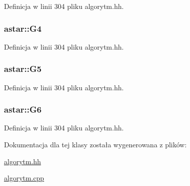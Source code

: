 Definicja w linii 304 pliku algorytm.\-hh.

\hypertarget{classastar_a347408992c953b3208642c68c106b9ac}{
\subsubsection[{G4}]{ astar\-::\-G4\hspace{0.3cm}{\ttfamily [private]}}}\label{classastar_a347408992c953b3208642c68c106b9ac}


Definicja w linii 304 pliku algorytm.\-hh.

\hypertarget{classastar_a55f869eccc405a0f76099e0ecd580eca}{
\subsubsection[{G5}]{ astar\-::\-G5\hspace{0.3cm}{\ttfamily [private]}}}\label{classastar_a55f869eccc405a0f76099e0ecd580eca}


Definicja w linii 304 pliku algorytm.\-hh.

\hypertarget{classastar_a01dac86d8230079b02b217d458aa7bc1}{
\subsubsection[{G6}]{ astar\-::\-G6\hspace{0.3cm}{\ttfamily [private]}}}\label{classastar_a01dac86d8230079b02b217d458aa7bc1}


Definicja w linii 304 pliku algorytm.\-hh.



Dokumentacja dla tej klasy została wygenerowana z plików\-:\begin{DoxyCompactItemize}
\item 
\hyperlink{algorytm_8hh}{algorytm.\-hh}\item 
\hyperlink{algorytm_8cpp}{algorytm.\-cpp}\end{DoxyCompactItemize}
